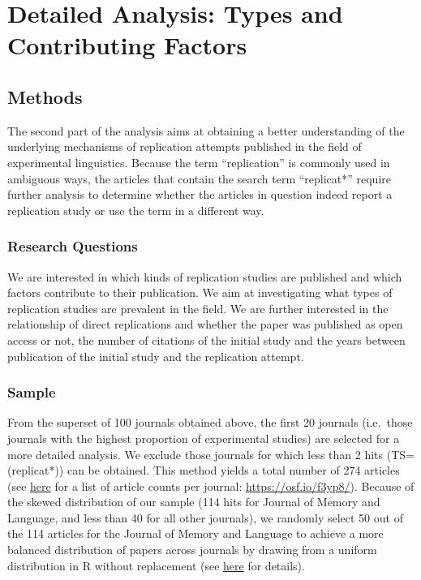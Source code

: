 \documentclass[
  english,
  man]{apa6}
\begin{document}
\hypertarget{detailed-analysis-types-and-contributing-factors}{%
\section{Detailed Analysis: Types and Contributing Factors}\label{detailed-analysis-types-and-contributing-factors}}

\hypertarget{methods}{%
\subsection{Methods}\label{methods}}

The second part of the analysis aims at obtaining a better understanding of the underlying mechanisms of replication attempts published in the field of experimental linguistics.
Because the term \enquote{replication} is commonly used in ambiguous ways, the articles that contain the search term \enquote{replicat*} require further analysis to determine whether the articles in question indeed report a replication study or use the term in a different way.

\hypertarget{research-questions-1}{%
\subsubsection{Research Questions}\label{research-questions-1}}

We are interested in which kinds of replication studies are published and which factors contribute to their publication.
We aim at investigating what types of replication studies are prevalent in the field.
We are further interested in the relationship of direct replications and whether the paper was published as open access or not, the number of citations of the initial study and the years between publication of the initial study and the replication attempt.

\hypertarget{sample-1}{%
\subsubsection{Sample}\label{sample-1}}

From the superset of 100 journals obtained above, the first 20 journals (i.e.~those journals with the highest proportion of experimental studies) are selected for a more detailed analysis.
We exclude those journals for which less than 2 hits (TS=(replicat*)) can be obtained.
This method yields a total number of 274 articles (see \href{https://osf.io/f3yp8/}{here} for a list of article counts per journal: \url{https://osf.io/f3yp8/}).
Because of the skewed distribution of our sample (114 hits for Journal of Memory and Language, and less than 40 for all other journals), we randomly select 50 out of the 114 articles for the Journal of Memory and Language to achieve a more balanced distribution of papers across journals by drawing from a uniform distribution in R without replacement (see \href{https://osf.io/6vfpe/}{here} for details).
\end{document}
